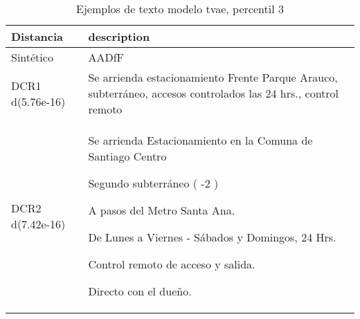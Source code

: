 \begin{table}[H]
\centering
\fontsize{10}{14}\selectfont
\caption{Ejemplos de texto modelo tvae, percentil 3}
\label{table-example-economicos-b-2-tvae-3p-text}
\begin{tabular}{|l|m{35em}|}
\hline
\rowcolor[gray]{0.8}
Distancia & description \\
\hline Sintético & AADfF \\
\hline DCR1 d(5.76e-16) & Se arrienda estacionamiento Frente Parque Arauco, subterr\'aneo, accesos controlados las 24 hrs., control remoto \\
\hline DCR2 d(7.42e-16) & Se arrienda Estacionamiento en la Comuna de Santiago Centro

Segundo subterr\'aneo ( -2 )

A pasos del Metro Santa Ana.


De Lunes a Viernes - S\'abados y Domingos, 24 Hrs.

Control remoto de acceso y salida.

Directo con el due\~no. \\
\hline
\end{tabular}
\end{table}
